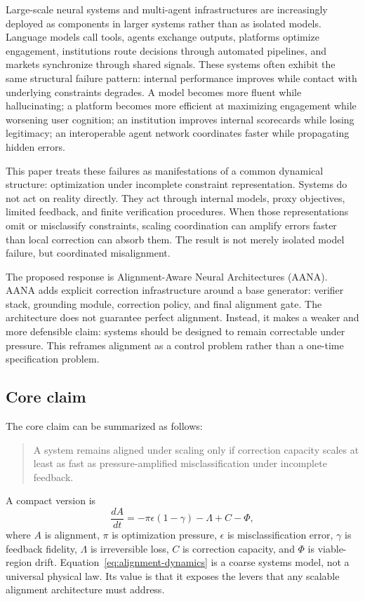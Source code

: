 \documentclass[11pt]{article}
\newcommand{\eps}{\epsilon}
\newcommand{\gam}{\gamma}
\begin{document}
Large-scale neural systems and multi-agent infrastructures are increasingly deployed as components in larger systems rather than as isolated models. Language models call tools, agents exchange outputs, platforms optimize engagement, institutions route decisions through automated pipelines, and markets synchronize through shared signals. These systems often exhibit the same structural failure pattern: internal performance improves while contact with underlying constraints degrades. A model becomes more fluent while hallucinating; a platform becomes more efficient at maximizing engagement while worsening user cognition; an institution improves internal scorecards while losing legitimacy; an interoperable agent network coordinates faster while propagating hidden errors.

This paper treats these failures as manifestations of a common dynamical structure: optimization under incomplete constraint representation. Systems do not act on reality directly. They act through internal models, proxy objectives, limited feedback, and finite verification procedures. When those representations omit or misclassify constraints, scaling coordination can amplify errors faster than local correction can absorb them. The result is not merely isolated model failure, but coordinated misalignment.

The proposed response is Alignment-Aware Neural Architectures (AANA). AANA adds explicit correction infrastructure around a base generator: verifier stack, grounding module, correction policy, and final alignment gate. The architecture does not guarantee perfect alignment. Instead, it makes a weaker and more defensible claim: systems should be designed to remain correctable under pressure. This reframes alignment as a control problem rather than a one-time specification problem.

\subsection{Core claim}

The core claim can be summarized as follows:
\begin{quote}
A system remains aligned under scaling only if correction capacity scales at least as fast as pressure-amplified misclassification under incomplete feedback.
\end{quote}
A compact version is
\begin{equation}
\frac{dA}{dt}= -\pi\eps(1-\gam)-\Lambda+C-\Phi,
\label{eq:alignment-dynamics}
\end{equation}
where $A$ is alignment, $\pi$ is optimization pressure, $\eps$ is misclassification error, $\gam$ is feedback fidelity, $\Lambda$ is irreversible loss, $C$ is correction capacity, and $\Phi$ is viable-region drift. Equation~\ref{eq:alignment-dynamics} is a coarse systems model, not a universal physical law. Its value is that it exposes the levers that any scalable alignment architecture must address.
\end{document}
